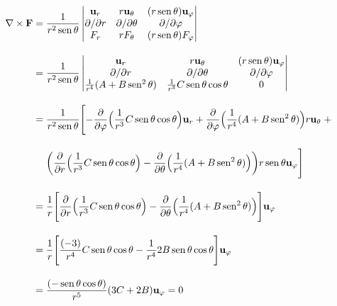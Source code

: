 \begin{align*}
    \nabla \times \textbf{F}
    =\; &
    \frac{1}{r^2 \operatorname{sen} \theta}
    \begin{vmatrix}
        \mathbf{u}_{r}        & r\mathbf{u_{\theta}}       & (r\operatorname{sen}\theta)\mathbf{u_{\varphi}} \\
        \partial / \partial r & \partial / \partial \theta & \partial / \partial \varphi       \\
        F_r                   & r F_\theta                 & (r \operatorname{sen}\theta)F_\varphi           \\
    \end{vmatrix}
    \\[10pt]
    =\; &
    \frac{1}{r^2 \operatorname{sen} \theta}
    \begin{vmatrix}
        \mathbf{u}_{r}                      & r\mathbf{u_{\theta}}                 & (r\operatorname{sen}\theta)\mathbf{u_{\varphi}} \\
        \partial / \partial r               & \partial / \partial \theta           & \partial / \partial \varphi       \\
        \frac{1}{r^4}(A + B \operatorname{sen}^2{\theta}) & \frac{1}{r^3}C \operatorname{sen}\theta \cos\theta & 0                                 \\
    \end{vmatrix}     \\[10pt]
    =\; &   \frac{1}{r^2 \operatorname{sen} \theta} \Biggl[
        - \frac{\partial}{\partial \varphi} \Bigl( \frac{1}{r^3} C \operatorname{sen}\theta \cos\theta \Bigr) \mathbf{u}_{r}
        + \frac{\partial}{\partial \varphi} \Bigl( \frac{1}{r^4} (A + B \operatorname{sen}^2{\theta})  \Bigr) r\mathbf{u}_{\theta} \; +  \\[10pt]
        & \biggl( \frac{\partial}{\partial r} \Bigl( \frac{1}{r^3} C \operatorname{sen}\theta \cos\theta   \Bigr)
        -  \frac{\partial}{\partial \theta} \Bigl( \frac{1}{r^4} (A + B \operatorname{sen}^2{\theta})
        \Bigr) \biggr) r \operatorname{sen}\theta \mathbf{u}_{\varphi}
        \Biggr] \\[10pt]
    =\; &  \frac{1}{r}
    \Biggl[
        \frac{\partial}{\partial r}
        \Bigl( \frac{1}{r^3} C \operatorname{sen}\theta \cos\theta
        \Bigr)
        -
        \frac{\partial}{\partial \theta}
        \Bigl( \frac{1}{r^4} (A + B \operatorname{sen}^2{\theta})
        \Bigr)
        \Biggr] \mathbf{u}_{\varphi}\\[10pt]
    =\; &  \frac{1}{r}
    \Biggl[
        \frac{(-3)}{r^4} C \operatorname{sen}\theta \cos\theta
        -
        \frac{1}{r^4} 2 B \operatorname{sen}\theta \cos\theta
        \Biggr] \mathbf{u}_{\varphi}\\[10pt]
    =\; &
    \frac{(- \operatorname{sen}\theta \cos\theta)}{r^5} (3C + 2B)  \mathbf{u}_{\varphi}  = 0 \\[10pt]
\end{align*}



